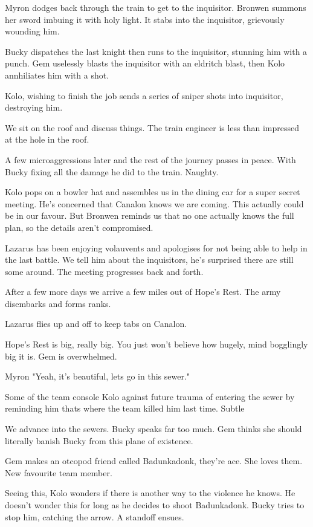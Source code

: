 Myron dodges back through the train to get to the inquisitor. Bronwen summons her sword imbuing it with holy light. It stabs into the inquisitor, grievously wounding him.\medskip

Bucky dispatches the last knight then runs to the inquisitor, stunning him with a punch. Gem uselessly blasts the inquisitor with an eldritch blast, then Kolo annhiliates him with a shot.\medskip

Kolo, wishing to finish the job sends a series of sniper shots into inquisitor, destroying him.\medskip

We sit on the roof and discuss things. The train engineer is less than impressed at the hole in the roof.\medskip

A few microaggressions later and the rest of the journey passes in peace. With Bucky fixing all the damage he did to the train. Naughty.\medskip

Kolo pops on a bowler hat and assembles us in the dining car for a super secret meeting. He's concerned that Canalon knows we are coming. This actually could be in our favour. But Bronwen reminds us that no one actually knows the full plan, so the details aren't compromised.\medskip

Lazarus has been enjoying volauvents and apologises for not being able to help in the last battle. We tell him about the inquisitors, he's surprised there are still some around. The meeting progresses back and forth.\medskip

After a few more days we arrive a few miles out of Hope's Rest. The army disembarks and forms ranks.\medskip

Lazarus flies up and off to keep tabs on Canalon.\medskip

Hope's Rest is big, really big. You just won't believe how hugely, mind bogglingly big it is. Gem is overwhelmed.\medskip

Myron "Yeah, it's beautiful, lets go in this sewer."\medskip

Some of the team console Kolo against future trauma of entering the sewer by reminding him thats where the team killed him last time. Subtle\medskip

We advance into the sewers. Bucky speaks far too much. Gem thinks she should literally banish Bucky from this plane of existence.\medskip

Gem makes an otcopod friend called Badunkadonk, they're ace. She loves them. New favourite team member.\medskip

Seeing this, Kolo wonders if there is another way to the violence he knows. He doesn't wonder this for long as he decides to shoot Badunkadonk. Bucky tries to stop him, catching the arrow. A standoff ensues.\medskip

\vspace*{5mm}
